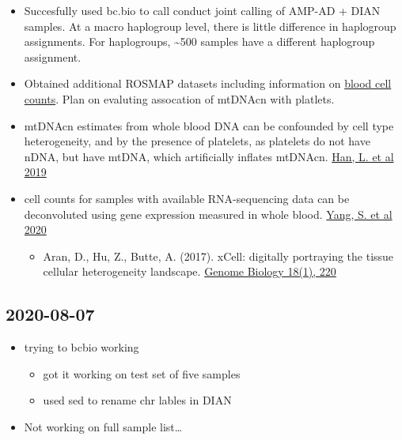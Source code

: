 \documentclass[]{book}
\providecommand{\tightlist}{%
  \setlength{\itemsep}{0pt}\setlength{\parskip}{0pt}}
\begin{document}
\begin{itemize}
\tightlist
\item
  Succesfully used bc.bio to call conduct joint calling of AMP-AD + DIAN samples. At a macro haplogroup level, there is little difference in haplogroup assignments. For haplogroups, \textasciitilde{}500 samples have a different haplogroup assignment.
\item
  Obtained additional ROSMAP datasets including information on \href{https://www.radc.rush.edu/docs/var/overview.htm?category=Blood+Measures\&subcategory=Routine+laboratory+tests}{blood cell counts}. Plan on evaluting assocation of mtDNAcn with platlets.
\item
  mtDNAcn estimates from whole blood DNA can be confounded by cell type heterogeneity, and by the presence of platelets, as platelets do not have nDNA, but have mtDNA, which artificially inflates mtDNAcn. \href{https://dx.doi.org/10.1016/j.psyneuen.2019.04.004}{Han, L. et al 2019}
\item
  cell counts for samples with available RNA-sequencing data can be deconvoluted using gene expression measured in whole blood. \href{https://dx.doi.org/10.1101/2020.07.17.209023}{Yang, S. et al 2020}

  \begin{itemize}
  \tightlist
  \item
    Aran, D., Hu, Z., Butte, A. (2017). xCell: digitally portraying the tissue cellular heterogeneity landscape. \href{https://dx.doi.org/10.1186/s13059-017-1349-1}{Genome Biology 18(1), 220}
  \end{itemize}
\end{itemize}

\hypertarget{section-5}{%
\subsection{2020-08-07}\label{section-5}}

\begin{itemize}
\tightlist
\item
  trying to bcbio working

  \begin{itemize}
  \tightlist
  \item
    got it working on test set of five samples
  \item
    used sed to rename chr lables in DIAN
  \end{itemize}
\item
  Not working on full sample list\ldots{}
\end{itemize}
\end{document}

